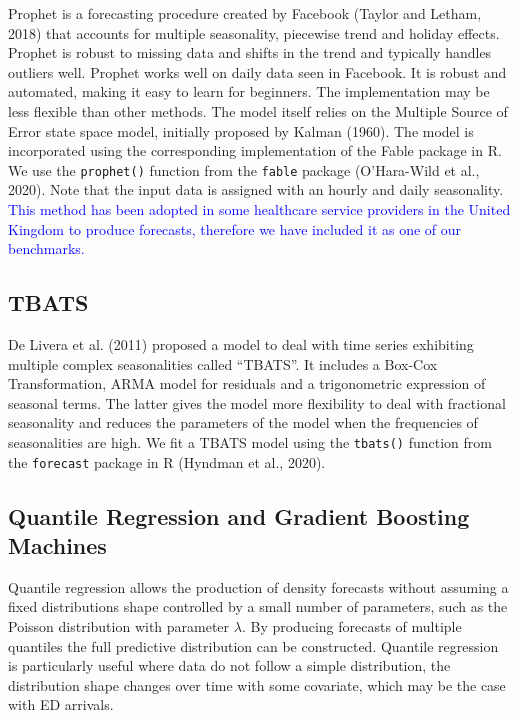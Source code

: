 \documentclass[]{elsarticle} %
\begin{document}
Prophet is a forecasting procedure created by Facebook
(Taylor and Letham, 2018) that accounts for multiple seasonality,
piecewise trend and holiday effects. Prophet is robust to missing data
and shifts in the trend and typically handles outliers well. Prophet
works well on daily data seen in Facebook. It is robust and automated,
making it easy to learn for beginners. The implementation may be less
flexible than other methods. The model itself relies on the Multiple
Source of Error state space model, initially proposed by Kalman (1960).
The model is incorporated using the corresponding implementation of the
Fable package in R. We use the \texttt{prophet()} function from the \texttt{fable}
package (O'Hara-Wild et al., 2020). Note that the input data is assigned with an
hourly and daily seasonality. \textcolor{blue}{This method has been adopted in some healthcare service providers in the United Kingdom to produce forecasts, therefore we have included it as one of our
benchmarks.}

\hypertarget{tbats}{%
\subsection{TBATS}\label{tbats}}

De Livera et al. (2011) proposed a model to deal with time series exhibiting
multiple complex seasonalities called ``TBATS''. It includes a Box-Cox
Transformation, ARMA model for residuals and a trigonometric expression
of seasonal terms. The latter gives the model more flexibility to deal
with fractional seasonality and reduces the parameters of the model when
the frequencies of seasonalities are high. We fit a TBATS model using
the \texttt{tbats()} function from the \texttt{forecast} package in R
(Hyndman et al., 2020).

\hypertarget{quantile-regression-and-gradient-boosting-machines}{%
\subsection{Quantile Regression and Gradient Boosting Machines}\label{quantile-regression-and-gradient-boosting-machines}}

Quantile regression allows the production of density forecasts without
assuming a fixed distributions shape controlled by a small number of
parameters, such as the Poisson distribution with parameter \(\lambda\).
By producing forecasts of multiple quantiles the full predictive
distribution can be constructed. Quantile regression is particularly
useful where data do not follow a simple distribution, the
distribution shape changes over time with some covariate, which may
be the case with ED arrivals.
\end{document}
